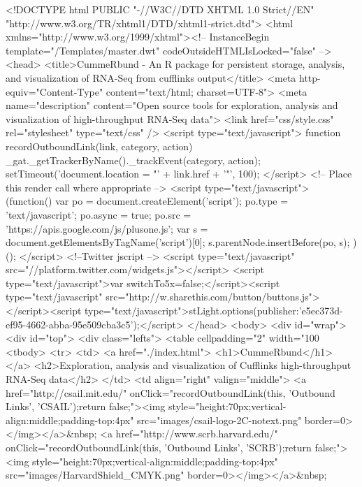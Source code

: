 <!DOCTYPE html PUBLIC "-//W3C//DTD XHTML 1.0 Strict//EN" "http://www.w3.org/TR/xhtml1/DTD/xhtml1-strict.dtd">
<html xmlns="http://www.w3.org/1999/xhtml"><!-- InstanceBegin template="/Templates/master.dwt" codeOutsideHTMLIsLocked="false" -->
<head>
    <title>CummeRbund - An R package for persistent storage, analysis, and visualization of RNA-Seq from cufflinks output</title>
    <meta http-equiv="Content-Type" content="text/html; charset=UTF-8">
	<meta name="description" content="Open source tools for exploration, analysis and visualization of high-throughput RNA-Seq data">
	<link href="css/style.css" rel="stylesheet" type="text/css" />
  	<script type="text/javascript">
  			function recordOutboundLink(link, category, action) {
    		_gat._getTrackerByName()._trackEvent(category, action);
    		setTimeout('document.location = "' + link.href + '"', 100);
  		}
	</script>
    <!-- Place this render call where appropriate -->
    <script type="text/javascript">
      (function() {
        var po = document.createElement('script'); po.type = 'text/javascript'; po.async = true;
        po.src = 'https://apis.google.com/js/plusone.js';
        var s = document.getElementsByTagName('script')[0]; s.parentNode.insertBefore(po, s);
      })();
    </script>
    <!--Twitter jscript -->
	<script type="text/javascript" src="//platform.twitter.com/widgets.js"></script>
    <script type="text/javascript">var switchTo5x=false;</script><script type="text/javascript" src="http://w.sharethis.com/button/buttons.js"></script><script type="text/javascript">stLight.options({publisher:'e5ec373d-ef95-4662-abba-95e509cba3c5'});</script>
  </head>
<body>
    <div id="wrap">
      <div id="top">
        <div class="lefts">
          <table cellpadding="2" width="100%
            <tbody>
              <tr>
                <td> <a href="./index.html">
                    <h1>CummeRbund</h1>
                  </a>
                  <h2>Exploration, analysis and visualization of Cufflinks high-throughput RNA-Seq data</h2>
                </td>
                <td align="right" valign="middle"> 
                 <a href="http://csail.mit.edu/" onClick="recordOutboundLink(this, 'Outbound Links', 'CSAIL');return false;"><img style="height:70px;vertical-align:middle;padding-top:4px" src="images/csail-logo-2C-notext.png" border=0></img></a>&nbsp;
                 <a href="http://www.scrb.harvard.edu/" onClick="recordOutboundLink(this, 'Outbound Links', 'SCRB');return false;"><img style="height:70px;vertical-align:middle;padding-top:4px" src="images/HarvardShield_CMYK.png" border=0></img></a>&nbsp;
               	 
